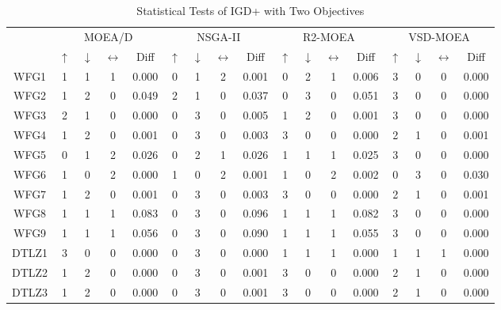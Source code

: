 \begin{table*}[t]
\caption{Statistical Tests of IGD+ with Two Objectives}
\label{tab:Tests_IGDP_2obj}
\centering
\begin{tabular}{c|c|c|c|c|c|c|c|c|c|c|c|c|c|c|c|c|}
\cline{2-17}
 & \multicolumn{4}{c|}{MOEA/D} & \multicolumn{4}{c|}{NSGA-II} & \multicolumn{4}{c|}{R2-MOEA} & \multicolumn{4}{c|}{VSD-MOEA}  \\ \cline{2-17} 
 & $\uparrow$ & $\downarrow$ & $\leftrightarrow$ & Diff & $\uparrow$ & $\downarrow$ & $\leftrightarrow$ & Diff & $\uparrow$ & $\downarrow$ & $\leftrightarrow$ & Diff & $\uparrow$ & $\downarrow$ & $\leftrightarrow$ & Diff \\ \hline
\multicolumn{1}{|c|}{WFG1} & 1 & 1 & 1 & 0.000 & 0 & 1 & 2 & 0.001 & 0 & 2 & 1 & 0.006 & 3 & 0 & 0 & 0.000 \\ \hline
\multicolumn{1}{|c|}{WFG2} & 1 & 2 & 0 & 0.049 & 2 & 1 & 0 & 0.037 & 0 & 3 & 0 & 0.051 & 3 & 0 & 0 & 0.000 \\ \hline
\multicolumn{1}{|c|}{WFG3} & 2 & 1 & 0 & 0.000 & 0 & 3 & 0 & 0.005 & 1 & 2 & 0 & 0.001 & 3 & 0 & 0 & 0.000 \\ \hline
\multicolumn{1}{|c|}{WFG4} & 1 & 2 & 0 & 0.001 & 0 & 3 & 0 & 0.003 & 3 & 0 & 0 & 0.000 & 2 & 1 & 0 & 0.001 \\ \hline
\multicolumn{1}{|c|}{WFG5} & 0 & 1 & 2 & 0.026 & 0 & 2 & 1 & 0.026 & 1 & 1 & 1 & 0.025 & 3 & 0 & 0 & 0.000 \\ \hline
\multicolumn{1}{|c|}{WFG6} & 1 & 0 & 2 & 0.000 & 1 & 0 & 2 & 0.001 & 1 & 0 & 2 & 0.002 & 0 & 3 & 0 & 0.030 \\ \hline
\multicolumn{1}{|c|}{WFG7} & 1 & 2 & 0 & 0.001 & 0 & 3 & 0 & 0.003 & 3 & 0 & 0 & 0.000 & 2 & 1 & 0 & 0.001 \\ \hline
\multicolumn{1}{|c|}{WFG8} & 1 & 1 & 1 & 0.083 & 0 & 3 & 0 & 0.096 & 1 & 1 & 1 & 0.082 & 3 & 0 & 0 & 0.000 \\ \hline
\multicolumn{1}{|c|}{WFG9} & 1 & 1 & 1 & 0.056 & 0 & 3 & 0 & 0.090 & 1 & 1 & 1 & 0.055 & 3 & 0 & 0 & 0.000 \\ \hline
\multicolumn{1}{|c|}{DTLZ1} & 3 & 0 & 0 & 0.000 & 0 & 3 & 0 & 0.000 & 1 & 1 & 1 & 0.000 & 1 & 1 & 1 & 0.000 \\ \hline
\multicolumn{1}{|c|}{DTLZ2} & 1 & 2 & 0 & 0.000 & 0 & 3 & 0 & 0.001 & 3 & 0 & 0 & 0.000 & 2 & 1 & 0 & 0.000 \\ \hline
\multicolumn{1}{|c|}{DTLZ3} & 1 & 2 & 0 & 0.000 & 0 & 3 & 0 & 0.001 & 3 & 0 & 0 & 0.000 & 2 & 1 & 0 & 0.000 \\ \hline

\end{tabular}
\end{table*}
